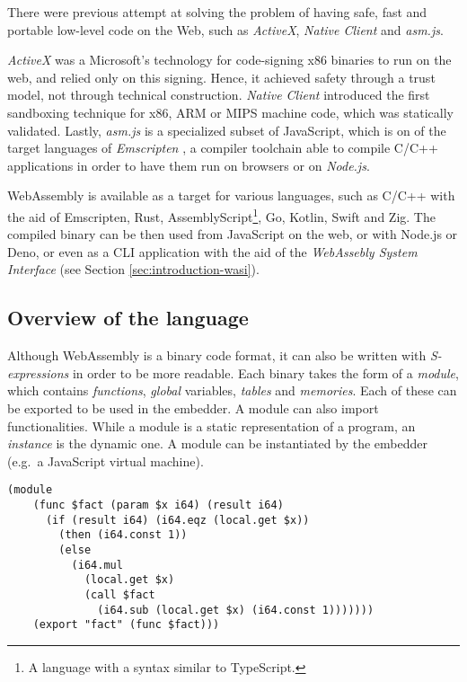 There were previous attempt at solving the problem of having safe, fast and portable low-level code on the Web,
such as \textit{ActiveX}, \textit{Native Client} and \textit{asm.js}.

\textit{ActiveX} \cite{activex} was a Microsoft's technology for code-signing x86 binaries to run on the web, and relied only
on this signing. Hence, it achieved safety through a trust model, not through technical construction.
\textit{Native Client} \cite{native-client} introduced the first sandboxing technique for x86, ARM or MIPS machine code,
which was statically validated. Lastly, \textit{asm.js} \cite{asmjs} is a specialized subset of JavaScript, which is on of the target
languages of \textit{Emscripten} \cite{emscripten}, a compiler toolchain able to compile C/C++ applications in order to have them
run on browsers or on \textit{Node.js}.

WebAssembly is available as a target for various languages, such as C/C++ with the aid of Emscripten, Rust,
AssemblyScript\footnote{A language with a syntax similar to TypeScript.}, Go, Kotlin, Swift and Zig.
The compiled binary can be then used from JavaScript on the web, or with Node.js or Deno, or even as a CLI application
with the aid of the \textit{WebAssebly System Interface} (see Section \ref*{sec:introduction-wasi}).

\subsection{Overview of the language}

Although WebAssembly is a binary code format, it can also be written with \textit{S-expressions}
in order to be more readable.
Each binary takes the form of a \textit{module}, which contains \textit{functions}, \textit{global} variables,
\textit{tables} and \textit{memories}. Each of these can be exported to be used in the embedder.
A module can also import functionalities.
While a module is a static representation of a program, an \textit{instance} is the dynamic one.
A module can be instantiated by the embedder (e.g.\ a JavaScript virtual machine).

\begin{lstlisting}[language=wasm, caption={Recursive factorial written in WebAssembly S-expressions}, label=lst:wasm-fact]
  (module
    (func $fact (param $x i64) (result i64)
      (if (result i64) (i64.eqz (local.get $x))
        (then (i64.const 1))
        (else
          (i64.mul
            (local.get $x)
            (call $fact
              (i64.sub (local.get $x) (i64.const 1)))))))
    (export "fact" (func $fact)))
\end{lstlisting}

